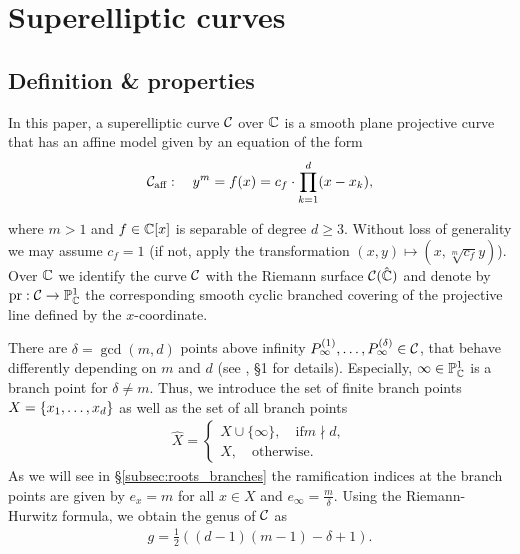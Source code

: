 \documentclass[main.tex]{subfiles}
\begin{document}
  \section{Superelliptic curves}\label{sec:se_curves}

  \subsection{Definition \& properties}

    \begin{defn}\label{def:se_curve}
    In this paper, a superelliptic curve $\mathcal{C}$ over $\mathbb{C}$ is a smooth plane projective curve that has an affine model given by an equation of the form
   \begin{align}\label{eq:aff_model}
    \mathcal{C}_{\text{aff}} : \quad y^m = f(x) =  c_f \cdot \prod_{k=1}^d (x-x_k),
   \end{align}
   \end{defn}
   where $m > 1$ and $f \in \mathbb{C}[x]$ is separable of degree $d \ge 3$.
   Without loss of generality we may assume $c_f = 1$ (if not, apply the transformation $(x,y) \mapsto (x,\sqrt[m]{c_f}y)$).  \abstand
   Over $\mathbb{C}$ we identify the curve $\mathcal{C}$ with the Riemann surface $\mathcal{C}(\hat{\mathbb{C}})$ and denote by $\operatorname{pr} : \mathcal{C} \rightarrow \mathbb{P}^1_{\mathbb{C}}$ the corresponding smooth cyclic branched covering of the projective line
   defined by the $x$-coordinate.

  There are $\delta = \gcd(m,d)$ points above infinity $P_{\infty}^{(1)},\dots,P_{\infty}^{(\delta)} \in \mathcal{C}$, that behave differently depending on $m$ and $d$ (see \cite{CT1996}, \S 1 for details).
  Especially, $\infty \in \mathbb{P}^1_{\mathbb{C}}$ is a branch point for $\delta \ne m$. Thus, we introduce the set of finite branch points $X = \{ x_1,\dots,x_d \}$ as well as the set of all branch points
  \vspace{-0.3cm}
  \begin{align}\label{eq:branch_points}
         \hat{X} = \begin{cases}   X \cup \{ \infty \}, \quad \text{if}  m  \nmid  d,\\
         X,\quad \text{otherwise.}
     \end{cases}
  \end{align}
  As we will see in \S \ref{subsec:roots_branches} the ramification indices at the branch points are given by $e_x = m$ for all $x \in X$ and $e_{\infty} = \frac{m}{\delta}$. Using the
  Riemann-Hurwitz formula, we obtain the genus of $\mathcal{C}$ as
   \vspace{-0.3cm}
  \begin{align}\label{eq:genus}
    g = \frac{1}{2}( (d-1)(m-1) - \delta + 1).
  \end{align}
\end{document}
